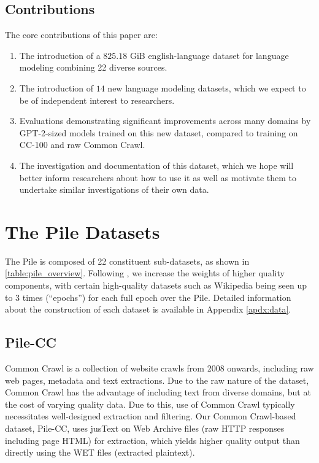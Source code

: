 \subsection{Contributions}

The core contributions of this paper are:

\begin{enumerate}
    \item The introduction of a $825.18$ GiB english-language dataset for language modeling combining 22 diverse sources. 
    \item The introduction of $14$ new language modeling datasets, which we expect to be of independent interest to researchers.
    \item Evaluations demonstrating significant improvements across many domains by GPT-2-sized models trained on this new dataset, compared to training on CC-100 and raw Common Crawl.
    \item The investigation and documentation of this dataset, which we hope will better inform researchers about how to use it as well as motivate them to undertake similar investigations of their own data.
\end{enumerate}

\section{The Pile Datasets}\label{sec:data}

The Pile is composed of 22 constituent sub-datasets, as shown in \ref{table:pile_overview}. 
Following \citet{GPT3}, we increase the weights of higher quality components, with certain high-quality datasets such as Wikipedia being seen up to 3 times (``epochs'') for each full epoch over the Pile. Detailed information about the construction of each dataset is available in Appendix \ref{apdx:data}.

\subsection{Pile-CC}

Common Crawl is a collection of website crawls from 2008 onwards, including raw web pages, metadata and text extractions. Due to the raw nature of the dataset, Common Crawl has the advantage of including text from diverse domains, but at the cost of varying quality data. Due to this, use of Common Crawl typically necessitates well-designed extraction and filtering. Our Common Crawl-based dataset, Pile-CC, uses jusText \citep{justext} on Web Archive files (raw HTTP responses including page HTML) for extraction, which yields higher quality output than directly using the WET files (extracted plaintext). 

